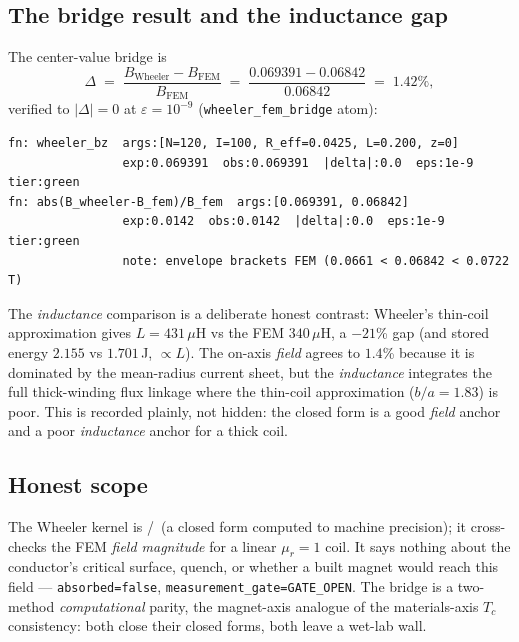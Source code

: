 \subsection{The bridge result and the inductance gap}
\label{app:wh-bridge}

The center-value bridge is
\begin{equation}
\Delta \;=\; \frac{B_{\text{Wheeler}}-B_{\text{FEM}}}{B_{\text{FEM}}}
  \;=\; \frac{0.069391-0.06842}{0.06842} \;=\; 1.42\%,
\label{eq:wh-bridge}
\end{equation}
verified to $|\Delta|=0$ at $\varepsilon=10^{-9}$
(\texttt{wheeler\_fem\_bridge} atom):
\begin{lstlisting}
fn: wheeler_bz  args:[N=120, I=100, R_eff=0.0425, L=0.200, z=0]
                exp:0.069391  obs:0.069391  |delta|:0.0  eps:1e-9  tier:green
fn: abs(B_wheeler-B_fem)/B_fem  args:[0.069391, 0.06842]
                exp:0.0142  obs:0.0142  |delta|:0.0  eps:1e-9  tier:green
                note: envelope brackets FEM (0.0661 < 0.06842 < 0.0722 T)
\end{lstlisting}
The \emph{inductance} comparison is a deliberate honest contrast: Wheeler's
thin-coil approximation gives $L=431\,\mu$H vs the FEM $340\,\mu$H, a
$-21$\% gap (and stored energy $2.155$ vs $1.701$\,J, $\propto L$). The
on-axis \emph{field} agrees to $1.4$\% because it is dominated by the
mean-radius current sheet, but the \emph{inductance} integrates the full
thick-winding flux linkage where the thin-coil approximation
($b/a\!=\!1.83$) is poor. This is recorded plainly, not hidden: the
closed form is a good \emph{field} anchor and a poor \emph{inductance}
anchor for a thick coil.

\subsection{Honest scope}
\label{app:wh-honest}

The Wheeler kernel is \tierBlue/\tierGreen\ (a closed form computed to
machine precision); it cross-checks the FEM \emph{field magnitude} for a
linear $\mu_r\!=\!1$ coil. It says nothing about the conductor's critical
surface, quench, or whether a built magnet would reach this field ---
\texttt{absorbed=false}, \texttt{measurement\_gate=GATE\_OPEN}. The bridge
is a two-method \emph{computational} parity, the magnet-axis analogue of
the materials-axis $T_c$ consistency: both close their closed forms, both
leave a wet-lab wall.
